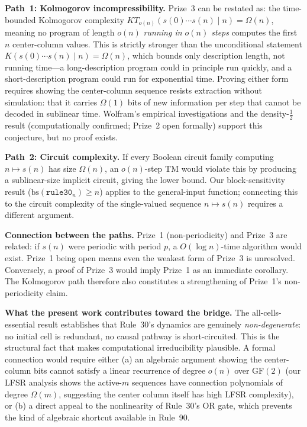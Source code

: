 \documentclass[11pt]{article}
\theoremstyle{plain}
\theoremstyle{definition}
\begin{document}
\textbf{Path~1: Kolmogorov incompressibility.}  Prize~3 can be restated as: the
time-bounded Kolmogorov complexity $KT_{o(n)}(s(0)\cdots s(n) \mid n) = \Omega(n)$,
meaning no program of length $o(n)$ \emph{running in $o(n)$ steps} computes the first
$n$ center-column values.  This is strictly stronger than the unconditional statement
$K(s(0)\cdots s(n) \mid n) = \Omega(n)$, which bounds only description length, not
running time---a long-description program could in principle run quickly, and a
short-description program could run for exponential time.  Proving either form requires
showing the center-column sequence resists extraction without simulation: that it carries
$\Omega(1)$ bits of new information per step that cannot be decoded in sublinear time.
Wolfram's empirical investigations and the density-$\frac{1}{2}$ result (computationally
confirmed; Prize~2 open formally) support this conjecture, but no proof exists.

\textbf{Path~2: Circuit complexity.}  If every Boolean circuit family computing
$n \mapsto s(n)$ has size $\Omega(n)$, an $o(n)$-step TM would violate this by
producing a sublinear-size implicit circuit, giving the lower bound.  Our
block-sensitivity result ($\mathrm{bs}(\mathtt{rule30}_n) \geq n$) applies to the
general-input function; connecting this to the circuit complexity of the single-valued
sequence $n \mapsto s(n)$ requires a different argument.

\textbf{Connection between the paths.}  Prize~1 (non-periodicity) and Prize~3 are
related: if $s(n)$ were periodic with period $p$, a $O(\log n)$-time algorithm would
exist.  Prize~1 being open means even the weakest form of Prize~3 is unresolved.
Conversely, a proof of Prize~3 would imply Prize~1 as an immediate corollary.  The
Kolmogorov path therefore also constitutes a strengthening of Prize~1's non-periodicity
claim.

\textbf{What the present work contributes toward the bridge.}  The all-cells-essential
result establishes that Rule~30's dynamics are genuinely \emph{non-degenerate}: no
initial cell is redundant, no causal pathway is short-circuited.  This is the
structural fact that makes computational irreducibility plausible.  A formal connection
would require either (a) an algebraic argument showing the center-column bits cannot
satisfy a linear recurrence of degree $o(n)$ over $\mathrm{GF}(2)$ (our LFSR analysis
shows the active-$m$ sequences have connection polynomials of degree $\Omega(m)$,
suggesting the center column itself has high LFSR complexity), or (b) a direct appeal
to the nonlinearity of Rule~30's OR gate, which prevents the kind of algebraic shortcut
available in Rule~90.
\end{document}
